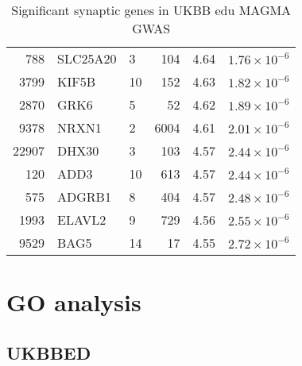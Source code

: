 \begin{table}[ht]
\begin{tabular}{rllrrr}
  788 & SLC25A20 & 3 & 104 & 4.64 & $1.76 \times 10^{-6}$ \\ 
  3799 & KIF5B & 10 & 152 & 4.63 & $1.82 \times 10^{-6}$ \\ 
  2870 & GRK6 & 5 &  52 & 4.62 & $1.89 \times 10^{-6}$ \\ 
  9378 & NRXN1 & 2 & 6004 & 4.61 & $2.01 \times 10^{-6}$ \\ 
  22907 & DHX30 & 3 & 103 & 4.57 & $2.44 \times 10^{-6}$ \\ 
  120 & ADD3 & 10 & 613 & 4.57 & $2.44 \times 10^{-6}$ \\ 
  575 & ADGRB1 & 8 & 404 & 4.57 & $2.48 \times 10^{-6}$ \\ 
  1993 & ELAVL2 & 9 & 729 & 4.56 & $2.55 \times 10^{-6}$ \\ 
  9529 & BAG5 & 14 &  17 & 4.55 & $2.72 \times 10^{-6}$ \\ 
   \hline
\end{tabular}
\caption{Significant synaptic genes in UKBB edu  MAGMA GWAS} 
\label{tab:Significant synaptic genes in UKBB edu  MAGMA GWAS}
\end{table}



\section{GO analysis}
\subsection{UKBBED}

